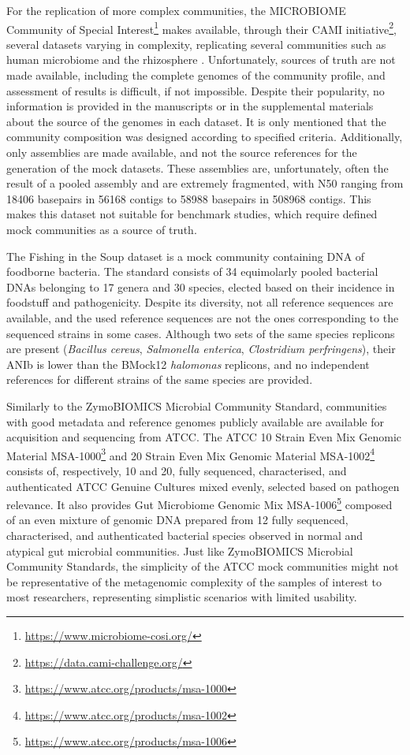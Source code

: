 For the replication of more complex communities, the MICROBIOME Community of Special Interest\footnote{\url{https://www.microbiome-cosi.org/}} makes available, through their \ac{CAMI} initiative\footnote{\url{https://data.cami-challenge.org/}}, several datasets varying in complexity, replicating several communities such as human microbiome and the rhizosphere \citep{sczyrba_critical_2017, meyer_critical_2022}. Unfortunately, sources of truth are not made available, including the complete genomes of the community profile, and assessment of results is difficult, if not impossible. Despite their popularity, no information is provided in the manuscripts or in the supplemental materials about the source of the genomes in each dataset. It is only mentioned that the community composition was designed according to specified criteria. Additionally, only assemblies are made available, and not the source references for the generation of the mock datasets. These assemblies are, unfortunately, often the result of a pooled assembly and are extremely fragmented, with N50 ranging from 18406 basepairs in 56168 contigs to 58988 basepairs in 508968 contigs. This makes this dataset not suitable for benchmark studies, which require defined mock communities as a source of truth. 

The Fishing in the Soup dataset \citep{grutzke_fishing_2019} is a mock community containing DNA of foodborne bacteria. The standard consists of 34 equimolarly pooled bacterial DNAs belonging to 17 genera and 30 species, elected based on their incidence in foodstuff and pathogenicity. Despite its diversity, not all reference sequences are available, and the used reference sequences are not the ones corresponding to the sequenced strains in some cases. Although two sets of the same species replicons are present (\textit{Bacillus cereus}, \textit{Salmonella enterica}, \textit{Clostridium perfringens}), their ANIb is lower than the BMock12 \textit{halomonas} replicons, and no independent references for different strains of the same species are provided. 

Similarly to the ZymoBIOMICS Microbial Community Standard, communities with good metadata and reference genomes publicly available are available for acquisition and sequencing from \ac{ATCC}. The \ac{ATCC} 10 Strain Even Mix Genomic
Material MSA-1000\footnote{\url{https://www.atcc.org/products/msa-1000}} and 20 Strain Even Mix Genomic Material MSA-1002\footnote{\url{https://www.atcc.org/products/msa-1002}} consists of, respectively, 10 and 20, fully sequenced, characterised, and authenticated \ac{ATCC} Genuine Cultures mixed evenly, selected based on pathogen relevance. It also provides Gut Microbiome Genomic Mix MSA-1006\footnote{\url{https://www.atcc.org/products/msa-1006}} composed of an even mixture of genomic DNA prepared from 12 fully sequenced, characterised, and authenticated bacterial species observed in normal and atypical gut microbial communities. Just like ZymoBIOMICS Microbial Community Standards, the simplicity of the ATCC mock communities might not be representative of the metagenomic complexity of the samples of interest to most researchers, representing simplistic scenarios with limited usability.


